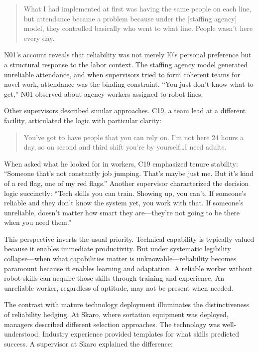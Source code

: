 \documentclass[12pt]{article}
\begin{document}
\begin{quote}
What I had implemented at first was having the same people on each line, but attendance became a problem because under the [staffing agency] model, they controlled basically who went to what line. People wasn't here every day.
\end{quote}

N01's account reveals that reliability was not merely I0's personal preference but a structural response to the labor context. The staffing agency model generated unreliable attendance, and when supervisors tried to form coherent teams for novel work, attendance was the binding constraint. ``You just don't know what to get,'' N01 observed about agency workers assigned to robot lines.

Other supervisors described similar approaches. C19, a team lead at a different facility, articulated the logic with particular clarity:

\begin{quote}
You've got to have people that you can rely on. I'm not here 24 hours a day, so on second and third shift you're by yourself\ldots I need adults.
\end{quote}

When asked what he looked for in workers, C19 emphasized tenure stability: ``Someone that's not constantly job jumping. That's maybe just me. But it's kind of a red flag, one of my red flags.'' Another supervisor characterized the decision logic succinctly: ``Tech skills you can train. Showing up, you can't. If someone's reliable and they don't know the system yet, you work with that. If someone's unreliable, doesn't matter how smart they are---they're not going to be there when you need them.''

This perspective inverts the usual priority. Technical capability is typically valued because it enables immediate productivity. But under systematic legibility collapse---when what capabilities matter is unknowable---reliability becomes paramount because it enables learning and adaptation. A reliable worker without robot skills can acquire those skills through training and experience. An unreliable worker, regardless of aptitude, may not be present when needed.

The contrast with mature technology deployment illuminates the distinctiveness of reliability hedging. At Skaro, where sortation equipment was deployed, managers described different selection approaches. The technology was well-understood. Industry experience provided templates for what skills predicted success. A supervisor at Skaro explained the difference:
\end{document}
